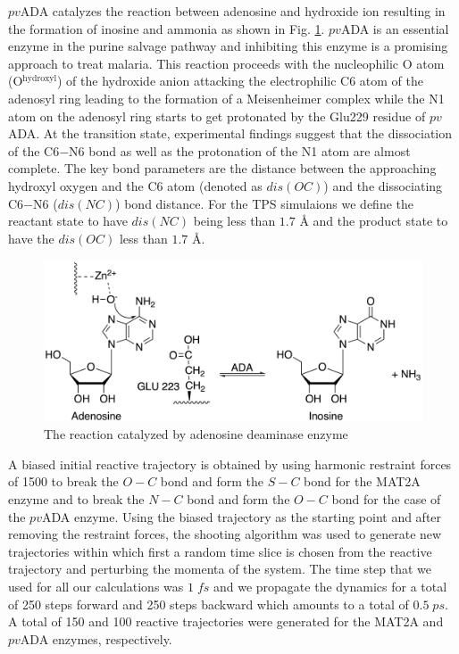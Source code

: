 \documentclass[journal=jpcbfk,manuscript=article,layout=twocolumn]{achemso}
\begin{document}
$pv$ADA catalyzes the reaction between adenosine and hydroxide ion 
resulting in the formation of inosine and ammonia as shown in
Fig. \ref{fig:ada-reaction}.
$pv$ADA is an essential enzyme in the purine salvage pathway and 
inhibiting this enzyme is a promising approach to treat malaria. \cite{Madrid08JBiolChem283p35899}  
This reaction proceeds with the nucleophilic O atom (O$^{\text{hydroxyl}}$) of the hydroxide anion
attacking the electrophilic C6 atom of the adenosyl ring leading to the formation of a Meisenheimer 
complex while the N1 atom on the adenosyl ring starts to get 
protonated by the Glu229 residue of $pv$ADA. At the transition state, experimental findings 
suggest that the dissociation of the C6$-$N6 bond as well as the protonation of the N1 
atom are almost complete. \cite{Luo07JAmChemSoc129p8008} The key bond parameters are 
the distance between the approaching hydroxyl oxygen and the C6 atom (denoted as $dis(OC)$) and the 
dissociating C6$-$N6 ($dis(NC)$) bond distance. For the TPS simulaions we define the reactant state to 
have $dis(NC)$ being less than $1.7$ {\AA} and the product state to have the 
$dis(OC)$ less than $1.7$ {\AA}.

\begin{figure}
\includegraphics[scale=0.6]{figures/ada-new.png}
\caption{The reaction catalyzed by adenosine deaminase enzyme}
\label{fig:ada-reaction}
\end{figure}

A biased initial reactive trajectory is obtained by using harmonic restraint forces 
of 1500 to break the $O-C$ bond and form the $S-C$ bond for the MAT2A enzyme and 
to break the $N-C$ bond and form the $O-C$ bond for the case of the $pv$ADA enzyme. 
Using the biased trajectory as the starting point and after removing the restraint 
forces, the shooting algorithm was used to generate
new trajectories within which first a random time slice is chosen from the reactive 
trajectory and perturbing the momenta of the system. 
The time step that we used for all our calculations was $1\;fs$ and we propagate the 
dynamics for a total of 250 steps forward and 250 steps backward which amounts to a 
total of $0.5\;ps$. 
A total of 150 and 100 reactive trajectories were generated for the MAT2A and $pv$ADA
enzymes, respectively. 
\end{document}

